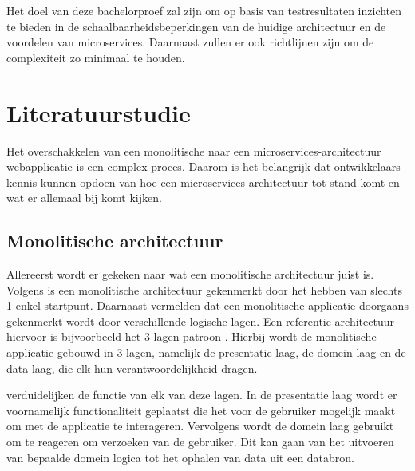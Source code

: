 Het doel van deze bachelorproef zal zijn om op basis van testresultaten inzichten te bieden in de schaalbaarheidsbeperkingen van de huidige architectuur en de voordelen van microservices. Daarnaast zullen er ook richtlijnen zijn om de complexiteit zo minimaal te houden.


\section{Literatuurstudie}%
\label{sec:literatuurstudie}

Het overschakkelen van een monolitische naar een microservices-architectuur webapplicatie is een complex proces. Daarom is het belangrijk dat ontwikkelaars kennis kunnen opdoen van hoe een microservices-architectuur tot stand komt en wat er allemaal bij komt kijken.

\subsection{Monolitische architectuur}

Allereerst wordt er gekeken naar wat een monolitische architectuur juist is. Volgens \textcite{Velepucha2023} is een monolitische architectuur gekenmerkt door het hebben van slechts 1 enkel startpunt. Daarnaast vermelden \textcite{Velepucha2023} dat een monolitische applicatie doorgaans gekenmerkt wordt door verschillende logische lagen. Een referentie architectuur hiervoor is bijvoorbeeld het 3 lagen patroon \autocite{Velepucha2023}. Hierbij wordt de monolitische applicatie gebouwd in 3 lagen, namelijk de presentatie laag, de domein laag en de data laag, die elk hun verantwoordelijkheid dragen.

\textcite{Blinowski2022} verduidelijken de functie van elk van deze lagen. In de presentatie laag wordt er voornamelijk functionaliteit geplaatst die het voor de gebruiker mogelijk maakt om met de applicatie te interageren. Vervolgens wordt de domein laag gebruikt om te reageren om verzoeken van de gebruiker. Dit kan gaan van het uitvoeren van bepaalde domein logica tot het ophalen van data uit een databron.



